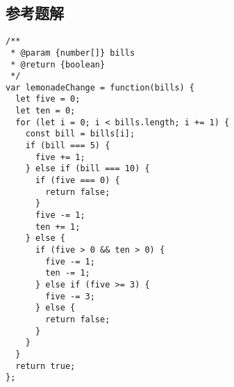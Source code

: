 \subsection{参考题解}

\begin{verbatim}
/**
 * @param {number[]} bills
 * @return {boolean}
 */
var lemonadeChange = function(bills) {
  let five = 0;
  let ten = 0;
  for (let i = 0; i < bills.length; i += 1) {
    const bill = bills[i];
    if (bill === 5) {
      five += 1;
    } else if (bill === 10) {
      if (five === 0) {
        return false;
      }
      five -= 1;
      ten += 1;
    } else {
      if (five > 0 && ten > 0) {
        five -= 1;
        ten -= 1;
      } else if (five >= 3) {
        five -= 3;
      } else {
        return false;
      }
    }
  }
  return true;
};
\end{verbatim}
